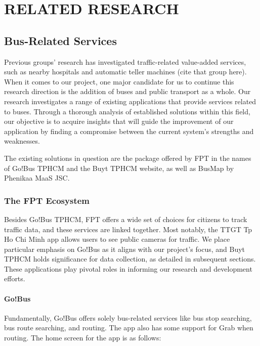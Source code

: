%
%
\section{RELATED RESEARCH}
\label{section:related_research}

\subsection{Bus-Related Services}

Previous groups' research has investigated traffic-related value-added services, such as nearby hospitals and automatic teller machines (cite that group here). When it comes to our project, one major candidate for us to continue this research direction is the addition of buses and public transport as a whole. Our research investigates a range of existing applications that provide services related to buses. Through a thorough analysis of established solutions within this field, our objective is to acquire insights that will guide the improvement of our application by finding a compromise between the current system's strengths and weaknesses.

The existing solutions in question are the package offered by FPT in the names of Go!Bus TPHCM and the Buyt TPHCM website, as well as BusMap by Phenikaa MaaS JSC.
\subsubsection{The FPT Ecosystem}

Besides Go!Bus TPHCM, FPT offers a wide set of choices for citizens to track traﬀic data, and these services are linked together. Most notably, the TTGT Tp Ho Chi Minh app allows users to see public cameras for traﬀic. We place particular emphasis on Go!Bus as it aligns with our project's focus, and Buyt TPHCM holds significance for data collection, as detailed in subsequent sections. These applications play pivotal roles in informing our research and development efforts.

\paragraph{Go!Bus}

Fundamentally, Go!Bus offers solely bus-related services like bus stop searching, bus route searching, and routing. The app also has some support for Grab when routing. The home screen for the app is as follows:

